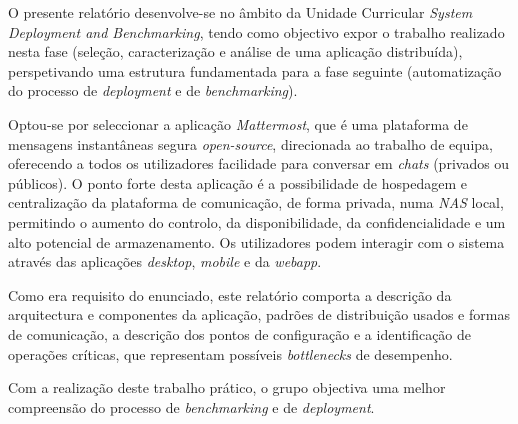 O presente relatório desenvolve-se no âmbito da Unidade Curricular \textit{System Deployment and Benchmarking}, tendo como objectivo expor o trabalho realizado nesta fase (seleção, caracterização e análise de uma aplicação distribuída), perspetivando uma estrutura fundamentada para a fase seguinte (automatização do processo de \textit{deployment} e de \textit{benchmarking}).
\par
Optou-se por seleccionar a aplicação \textit{Mattermost}, que é uma plataforma de mensagens instantâneas segura \textit{open-source}, direcionada ao trabalho de equipa, oferecendo a todos os utilizadores facilidade para conversar em \textit{chats} (privados ou públicos). O ponto forte desta aplicação é a possibilidade de hospedagem e centralização da plataforma de comunicação, de forma privada, numa \textit{NAS} local, permitindo o aumento do controlo, da disponibilidade, da confidencialidade e um alto potencial de armazenamento.
Os utilizadores podem interagir com o sistema através das aplicações \textit{desktop},  \textit{mobile} e da \textit{webapp}.
\par
Como era requisito do enunciado, este relatório comporta a descrição da arquitectura e componentes da aplicação, padrões de distribuição usados e formas de comunicação, a descrição dos pontos de configuração e a identificação de operações críticas, que representam possíveis \textit{bottlenecks} de desempenho. 
\par
Com a realização deste trabalho prático, o grupo objectiva uma melhor compreensão do processo de \textit{benchmarking} e de \textit{deployment}.
\par